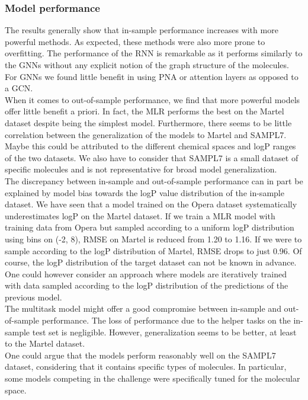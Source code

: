 \documentclass{article}
\theoremstyle{definition}
\theoremstyle{remark}
\begin{document}
\subsubsection{Model performance}

The results generally show that in-sample performance increases with more powerful methods. As expected, these methods were also more prone to overfitting. The performance of the RNN is remarkable as it performs similarly to the GNNs without any explicit notion of the graph structure of the molecules. For GNNs we found little benefit in using PNA or attention layers as opposed to a GCN. \\

When it comes to out-of-sample performance, we find that more powerful models offer little benefit a priori. In fact, the MLR performs the best on the Martel dataset despite being the simplest model. Furthermore, there seems to be little correlation between the generalization of the models to Martel and SAMPL7. Maybe this could be attributed to the different chemical spaces and logP ranges of the two datasets. We also have to consider that SAMPL7 is a small dataset of specific molecules and is not representative for broad model generalization. \\

The discrepancy between in-sample and out-of-sample performance can in part be explained by model bias towards the logP value distribution of the in-sample dataset. We have seen that a model trained on the Opera dataset systematically underestimates logP on the Martel dataset. If we train a MLR model with training data from Opera but sampled according to a uniform logP distribution using bins on (-2, 8), RMSE on Martel is reduced from 1.20 to 1.16. If we were to sample according to the logP distribution of Martel, RMSE drops to just 0.96. Of course, the logP distribution of the target dataset can not be known in advance. One could however consider an approach where models are iteratively trained with data sampled according to the logP distribution of the predictions of the previous model.\\

The multitask model might offer a good compromise between in-sample and out-of-sample performance. The loss of performance due to the helper tasks on the in-sample test set is negligible. However, generalization seems to be better, at least to the Martel dataset. \\

One could argue that the models perform reasonably well on the SAMPL7 dataset, considering that it contains specific types of molecules. In particular, some models competing in the challenge were specifically tuned for the molecular space. \\
\end{document}
